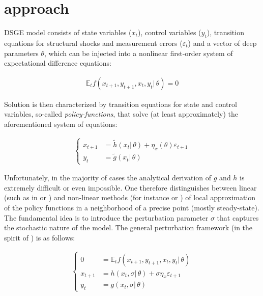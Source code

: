 \documentclass{pracamgr}
\numberwithin{equation}{section}
\begin{document}
\section{\citet{klein2000using} approach}

DSGE model consists of state variables ($x_{t}$), control variables ($y_{t}$), transition equations for structural shocks and measurement errors ($\varepsilon_{t}$) and a vector of deep parameters $\theta$, which can be injected into a nonlinear first-order system of expectational difference equations:

\begin{align}
\mathbb{E}_{t}f\left(x_{t+1},y_{t+1},x_{t},y_{t} | \, \theta \right) = 0
\end{align}

Solution is then characterized by transition equations for state and control variables, so-called \textit{policy-functions}, that solve (at least approximately) the aforementioned system of equations:

\begin{align}
\left\{
\begin{array}{cl}
x_{t+1} &= \widetilde{h} \left( x_{t} | \, \theta \right) + \eta_{x} \left( \theta \right) \varepsilon_{t+1} \\
y_{t} &= \widetilde{g} \left( x_{t} | \, \theta \right)
\end{array}
\right.
\end{align}

Unfortunately, in the majority of cases the analytical derivation of $g$ and $h$ is extremely difficult or even impossible. One therefore distinguishes between linear (such as in \citet{klein2000using} or \citet{sims2002solving}) and non-linear methods (for instance \citet{schmitt2004solving} or \citet{gomme2011second}) of local approximation of the policy functions in a neighborhood of a precise point (mostly steady-state). The fundamental idea is to introduce the perturbation parameter $\sigma$ that captures the stochastic nature of the model. The general perturbation framework (in the spirit of \citet{schmitt2004solving}) is as follows:

\begin{align}
\left\{
\begin{array}{cl}
0 &= \mathbb{E}_{t}f\left(x_{t+1},y_{t+1},x_{t},y_{t} | \, \theta \right) \\
x_{t+1} &= h \left( x_{t}, \sigma | \, \theta \right) + \sigma \eta_{x} \varepsilon_{t+1} \\
y_{t} &= g \left( x_{t}, \sigma | \, \theta \right)
\end{array}
\right.
\end{align}
\end{document}
